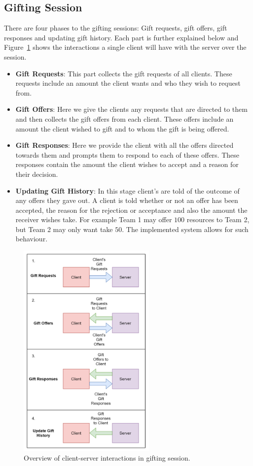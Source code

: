 \subsection{Gifting Session}
\label{subsec:IITO:gifting_session} 

There are four phases to the gifting sessions: Gift requests, gift offers, gift responses and updating gift history. Each part is further explained below and Figure~\ref{fig:IITO:gifting_session_diagram} shows the interactions a single client will have with the server over the session.
\begin{itemize}
    \item \textbf{Gift Requests}: This part collects the gift requests of all clients. These requests include an amount the client wants and who they wish to request from.
    \item \textbf{Gift Offers}: Here we give the clients any requests that are directed to them and then collects the gift offers from each client. These offers include an amount the client wished to gift and to whom the gift is being offered.
    \item \textbf{Gift Responses}: Here we provide the client with all the offers directed towards them and prompts them to respond to each of these offers. These responses contain the amount the client wishes to accept and a reason for their decision.
    \item \textbf{Updating Gift History}: In this stage client's are told of the outcome of any offers they gave out. A client is told whether or not an offer has been accepted, the reason for the rejection or acceptance and also the amount the receiver wishes take. For example Team 1 may offer $100$ resources to Team 2, but Team 2 may only want take $50$. The implemented system allows for such behaviour.
\end{itemize}

\begin{figure}[!htb]
    \centering
    \includegraphics[width=0.6\textwidth]{06_iito/images/gifting_diagram.png}
    \caption{Overview of client-server interactions in gifting session.}
    \label{fig:IITO:gifting_session_diagram}
\end{figure}

